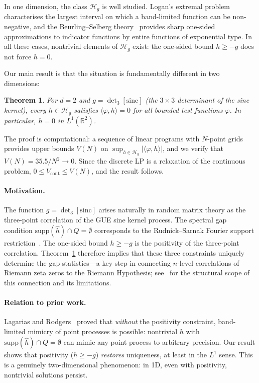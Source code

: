 \documentclass[11pt]{article}
\newtheorem{theorem}{Theorem}
\begin{document}
In one dimension, the class $\mathcal{H}_g$ is well studied. Logan's
extremal problem~\cite{Logan1983} characterises the largest interval on
which a band-limited function can be non-negative, and the
Beurling--Selberg theory~\cite{Vaaler1985} provides sharp one-sided
approximations to indicator functions by entire functions of exponential
type. In all these cases, nontrivial elements of $\mathcal{H}_g$ exist:
the one-sided bound $h \geq -g$ does not force $h = 0$.

Our main result is that the situation is fundamentally different in two
dimensions:

\begin{theorem}\label{thm:main}
For $d = 2$ and $g = \det_3[\mathrm{sinc}]$ (the $3 \times 3$
determinant of the sinc kernel), every $h \in \mathcal{H}_g$
satisfies $\langle \varphi, h \rangle = 0$ for all bounded test
functions $\varphi$. In particular, $h = 0$ in $L^1(\mathbb{R}^2)$.
\end{theorem}

The proof is computational: a sequence of linear programs with
$N$-point grids provides upper bounds $V(N)$ on
$\sup_{h \in \mathcal{H}_g} |\langle \varphi, h \rangle|$, and we
verify that $V(N) = 35.5/N^2 \to 0$. Since the discrete LP is a
relaxation of the continuous problem, $0 \leq V_{\mathrm{cont}} \leq V(N)$,
and the result follows.

\paragraph{Motivation.}
The function $g = \det_3[\mathrm{sinc}]$ arises naturally in random
matrix theory as the three-point correlation of the GUE sine kernel
process. The spectral gap condition $\mathrm{supp}(\hat{h}) \cap Q = \emptyset$
corresponds to the Rudnick--Sarnak Fourier support
restriction~\cite{RudnickSarnak1996}. The one-sided bound
$h \geq -g$ is the positivity of the three-point correlation.
Theorem~\ref{thm:main} therefore implies that these three constraints
uniquely determine the gap statistics---a key step in connecting
$n$-level correlations of Riemann zeta zeros to the Riemann
Hypothesis; see~\cite{alarcon2026d} for the structural scope of
this connection and its limitations.

\paragraph{Relation to prior work.}
Lagarias and Rodgers~\cite{LagariaRodgers2019} proved that
\emph{without} the positivity constraint, band-limited mimicry of
point processes is possible: nontrivial $h$ with
$\mathrm{supp}(\hat{h}) \cap Q = \emptyset$ can mimic any point
process to arbitrary precision. Our result shows that positivity
($h \geq -g$) \emph{restores} uniqueness, at least in the $L^1$
sense. This is a genuinely two-dimensional phenomenon: in 1D, even
with positivity, nontrivial solutions persist.
\end{document}
